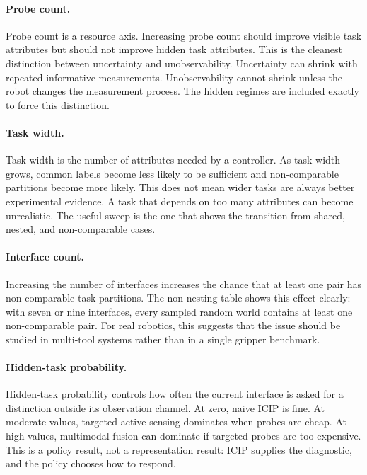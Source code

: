 \documentclass{article}
\newcommand{\icip}{\textsc{ICIP}}
\begin{document}
\paragraph{Probe count.}
Probe count is a resource axis.
Increasing probe count should improve visible task attributes but should not improve hidden task attributes.
This is the cleanest distinction between uncertainty and unobservability.
Uncertainty can shrink with repeated informative measurements.
Unobservability cannot shrink unless the robot changes the measurement process.
The hidden regimes are included exactly to force this distinction.

\paragraph{Task width.}
Task width is the number of attributes needed by a controller.
As task width grows, common labels become less likely to be sufficient and non-comparable partitions become more likely.
This does not mean wider tasks are always better experimental evidence.
A task that depends on too many attributes can become unrealistic.
The useful sweep is the one that shows the transition from shared, nested, and non-comparable cases.

\paragraph{Interface count.}
Increasing the number of interfaces increases the chance that at least one pair has non-comparable task partitions.
The non-nesting table shows this effect clearly: with seven or nine interfaces, every sampled random world contains at least one non-comparable pair.
For real robotics, this suggests that the issue should be studied in multi-tool systems rather than in a single gripper benchmark.

\paragraph{Hidden-task probability.}
Hidden-task probability controls how often the current interface is asked for a distinction outside its observation channel.
At zero, naive \icip{} is fine.
At moderate values, targeted active sensing dominates when probes are cheap.
At high values, multimodal fusion can dominate if targeted probes are too expensive.
This is a policy result, not a representation result: \icip{} supplies the diagnostic, and the policy chooses how to respond.
\end{document}
